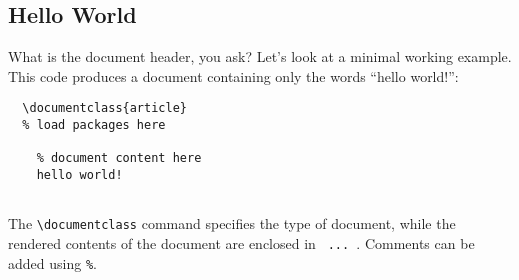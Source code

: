 \subsection{Hello World}
What is the document header, you ask?
Let's look at a minimal working example.
This code produces a document containing only the words ``hello world!'':
\begin{lstlisting}
  \documentclass{article}
  % load packages here
  
    % document content here
    hello world!
  
\end{lstlisting}
The \lstinline|\documentclass| command specifies the type of document,
while the rendered contents of the document are enclosed in
\lstinline| ... |.
Comments can be added using \lstinline|%|.
